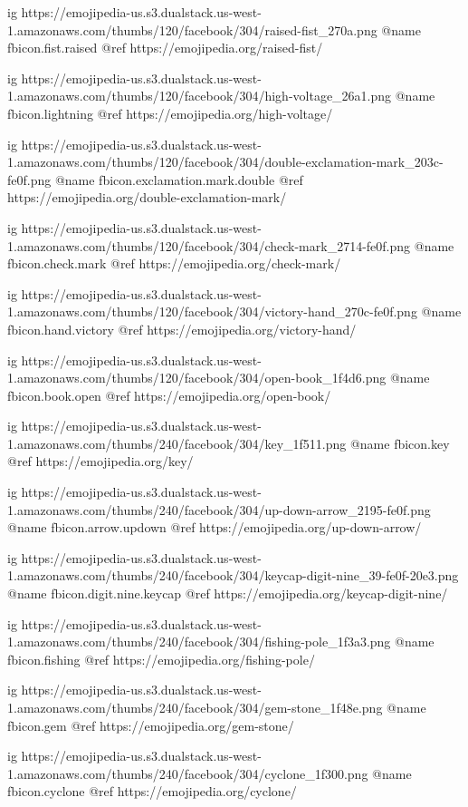  ig https://emojipedia-us.s3.dualstack.us-west-1.amazonaws.com/thumbs/120/facebook/304/raised-fist_270a.png
  @name fbicon.fist.raised
  @ref https://emojipedia.org/raised-fist/

  ig https://emojipedia-us.s3.dualstack.us-west-1.amazonaws.com/thumbs/120/facebook/304/high-voltage_26a1.png
  @name fbicon.lightning
  @ref https://emojipedia.org/high-voltage/

  ig https://emojipedia-us.s3.dualstack.us-west-1.amazonaws.com/thumbs/120/facebook/304/double-exclamation-mark_203c-fe0f.png
  @name fbicon.exclamation.mark.double
  @ref https://emojipedia.org/double-exclamation-mark/

  ig https://emojipedia-us.s3.dualstack.us-west-1.amazonaws.com/thumbs/120/facebook/304/check-mark_2714-fe0f.png
  @name fbicon.check.mark
  @ref https://emojipedia.org/check-mark/

  ig https://emojipedia-us.s3.dualstack.us-west-1.amazonaws.com/thumbs/120/facebook/304/victory-hand_270c-fe0f.png
  @name fbicon.hand.victory
  @ref https://emojipedia.org/victory-hand/

  ig https://emojipedia-us.s3.dualstack.us-west-1.amazonaws.com/thumbs/120/facebook/304/open-book_1f4d6.png
  @name fbicon.book.open
  @ref https://emojipedia.org/open-book/

  ig https://emojipedia-us.s3.dualstack.us-west-1.amazonaws.com/thumbs/240/facebook/304/key_1f511.png
  @name fbicon.key
  @ref https://emojipedia.org/key/

  ig https://emojipedia-us.s3.dualstack.us-west-1.amazonaws.com/thumbs/240/facebook/304/up-down-arrow_2195-fe0f.png
  @name fbicon.arrow.updown
  @ref https://emojipedia.org/up-down-arrow/

  ig https://emojipedia-us.s3.dualstack.us-west-1.amazonaws.com/thumbs/240/facebook/304/keycap-digit-nine_39-fe0f-20e3.png
  @name fbicon.digit.nine.keycap
  @ref https://emojipedia.org/keycap-digit-nine/

  ig https://emojipedia-us.s3.dualstack.us-west-1.amazonaws.com/thumbs/240/facebook/304/fishing-pole_1f3a3.png
  @name fbicon.fishing
  @ref https://emojipedia.org/fishing-pole/

  ig https://emojipedia-us.s3.dualstack.us-west-1.amazonaws.com/thumbs/240/facebook/304/gem-stone_1f48e.png
  @name fbicon.gem
  @ref https://emojipedia.org/gem-stone/

  ig https://emojipedia-us.s3.dualstack.us-west-1.amazonaws.com/thumbs/240/facebook/304/cyclone_1f300.png
  @name fbicon.cyclone
  @ref https://emojipedia.org/cyclone/

